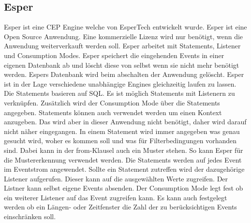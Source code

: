 \subsection{Esper}
Esper ist eine CEP Engine welche von EsperTech entwickelt wurde. Esper ist eine Open Source Anwendung. Eine kommerzielle Lizenz wird nur benötigt, wenn die Anwendung weiterverkauft werden soll. Esper arbeitet mit Statements, Listener und Consumption Modes. Esper speichert die eingehenden Events in einer eigenen Datenbank ab und löscht diese von selbst wenn sie nicht mehr benötigt werden. Espers Datenbank wird beim abschalten der Anwendung gelöscht. Esper ist in der Lage verschiedene unabhängige Engines gleichzeitig laufen zu lassen. 
\\ 
Die Statements basieren auf SQL. Es ist möglich Statements mit Listenern zu verknüpfen. Zusätzlich wird der Consumption Mode über die Statements angegeben. Statements können auch verwendet werden um einen Kontext anzugeben. Das wird aber in dieser Anwendung nicht benötigt, daher wird darauf nicht näher eingegangen. In einem Statement wird immer angegeben was genau gesucht wird, woher es kommen soll und was für Filterbedingungen vorhanden sind. Dabei kann in der from-Klausel auch ein Muster stehen. So kann Esper für die Mustererkennung verwendet werden. Die Statements werden auf jedes Event im Eventstrom angewendet. Sollte ein Statement zutreffen wird der dazugehörige Listener aufgerufen. Dieser kann auf die ausgewählten Werte zugreifen. Der Listner kann selbst eigene Events absenden. Der Consumption Mode legt fest ob ein weiterer Listener auf das Event zugreifen kann. Es kann auch festgelegt werden ob ein Längen- oder Zeitfenster die Zahl der zu berücksichtigen Events einschränken soll.   

